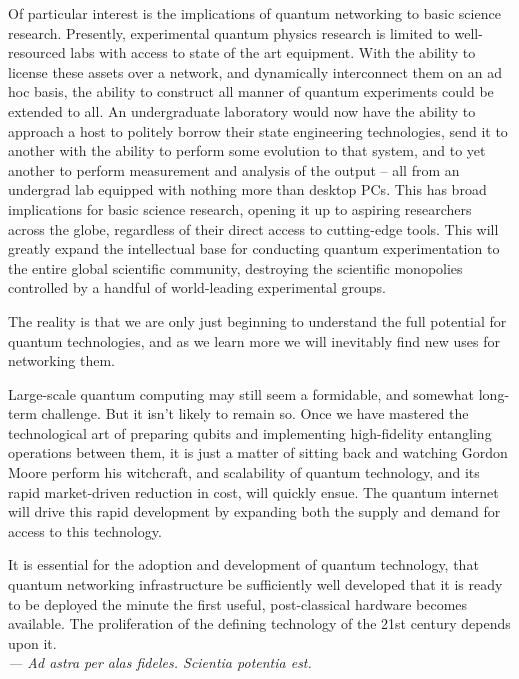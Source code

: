 \documentclass[aps,rmp,twocolumn,amsmath,amssymb,nofootinbib,superscriptaddress,longbibliography,floatfix,table-of-contents,eqsecnum]{revtex4-1}
\begin{document}
Of particular interest is the implications of quantum networking to basic science research. Presently, experimental quantum physics research is limited to well-resourced labs with access to state of the art equipment. With the ability to license these assets over a network, and dynamically interconnect them on an ad hoc basis, the ability to construct all manner of quantum experiments could be extended to all. An undergraduate laboratory would now have the ability to approach a host to politely borrow their state engineering technologies, send it to another with the ability to perform some evolution to that system, and to yet another to perform measurement and analysis of the output -- all from an undergrad lab equipped with nothing more than desktop PCs. This has broad implications for basic science research, opening it up to aspiring researchers across the globe, regardless of their direct access to cutting-edge tools. This will greatly expand the intellectual base for conducting quantum experimentation to the entire global scientific community, destroying the scientific monopolies controlled by a handful of world-leading experimental groups.

The reality is that we are only just beginning to understand the full potential for quantum technologies, and as we learn more we will inevitably find new uses for networking them.

Large-scale quantum computing may still seem a formidable, and somewhat long-term challenge. But it isn't likely to remain so. Once we have mastered the technological art of preparing qubits and implementing high-fidelity entangling operations between them, it is just a matter of sitting back and watching Gordon Moore perform his witchcraft, and scalability of quantum technology, and its rapid market-driven reduction in cost, will quickly ensue. The quantum internet will drive this rapid development by expanding both the supply and demand for access to this technology.

It is essential for the adoption and development of quantum technology, that quantum networking infrastructure be sufficiently well developed that it is ready to be deployed the minute the first useful, post-classical hardware becomes available. The proliferation of the defining technology of the 21st century depends upon it.
\\

\textit{--- Ad astra per alas fideles. Scientia potentia est.}

%
%
\end{document}
